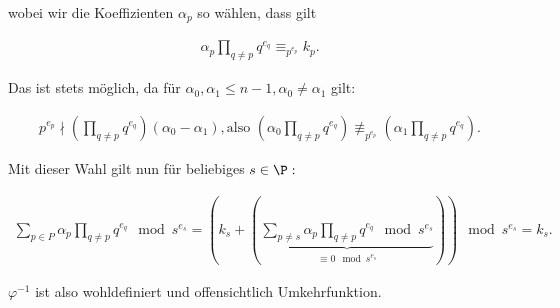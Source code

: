 \begin{solution}
wobei wir die Koeffizienten $\alpha_p$ so wählen, dass gilt

\begin{align}
    \alpha_p \prod_{q \neq p} q^{e_q} \equiv_{p^{e_{p}}} k_{p}.
\end{align}

Das ist stets möglich, da für $\alpha_0, \alpha_1 \leq n-1, \alpha_0 \neq \alpha_1$ gilt:

\begin{align}
    p^{e_{p}} \nmid \left(\prod_{q \neq p} q^{e_q}\right) (\alpha_0 - \alpha_1), \text{also~}
    \left(\alpha_0 \prod_{q \neq p} q^{e_q}\right) \not\equiv_{p^{e_p}}
    \left(\alpha_1 \prod_{q \neq p} q^{e_q}\right).
\end{align}

Mit dieser Wahl gilt nun für beliebiges $s \in \P:$

\begin{align}
\sum_{p \in P} \alpha_p \prod_{q \neq p} q^{e_q} \mod s^{e_s} = \left(k_s + \left(\underbrace{\sum_{p \neq s} \alpha_p \prod_{q \neq p} q^{e_q} \mod s^{e_s}}_\substack{\equiv 0 \mod s^{e_s}}\right)\right) \mod s^{e_s} = k_s.
\end{align}

$\varphi^{-1}$ ist also wohldefiniert und offensichtlich Umkehrfunktion.
\end{solution}
